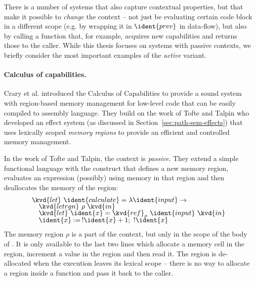 There is a number of systems that also capture contextual properties, but that make it possible to 
\emph{change} the context -- not just be evaluating certain code block in a different scope (e.g. by 
wrapping it in $\ident{prev}$ in data-flow), but also by calling a function that, for example, acquires 
new capabilities and returns those to the caller. While this thesis focuses on systems with passive 
contexts, we briefly consider the most important examples of the \emph{active} variant.


\paragraph{Calculus of capabilities.}
Crary et al. \cite{app-capabilities} introduced the Calculus of Capabilities to provide 
a sound system with region-based memory management for low-level code that can be easily 
compiled to assembly language. They build on the work of Tofte and Talpin \cite{app-region-memory}
who developed an effect system (as discussed in Section~\ref{sec:path-sem-effects}) that uses
lexically scoped \emph{memory regions} to provide an efficient and controlled memory management.

In the work of Tofte and Talpin, the context is \emph{passive}. They extend a simple functional language
with the  construct that defines a new memory region, evaluates an expression (possibly)
using memory in that region and then deallocates the memory of the region:
%
\begin{equation*}
\begin{array}{l}
\kvd{let}~\ident{calculate} = \lambda \ident{input} \rightarrow\\[-0.25em]
\quad \kvd{letrgn}~\rho~\kvd{in}\\[-0.25em]
\quad \kvd{let}~\ident{x} = \kvd{ref}_\rho ~\ident{input}~\kvd{in}\\[-0.25em]
\quad \ident{x} :=\, !\ident{x} + 1;~ !\ident{x}
\end{array}
\end{equation*}
%
The memory region $\rho$ is a part of the context, but only in the scope of the body of 
. It is only available to the last two lines which allocate a memory cell in the region,
increment a value in the region and then read it. The region is de-allocated when the execution 
leaves its lexical scope -- there is no way to allocate a region inside a function and pass it back 
to the caller.

